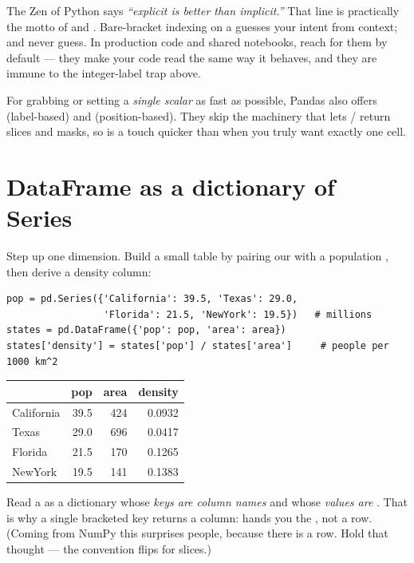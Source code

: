 \documentclass[11pt]{article}
\begin{document}
\begin{keyidea}
The Zen of Python says \emph{``explicit is better than implicit.''} That line is practically the motto of  and . Bare-bracket indexing on a  guesses your intent from context;  and  never guess. In production code and shared notebooks, reach for them by default --- they make your code read the same way it behaves, and they are immune to the integer-label trap above.
\end{keyidea}

For grabbing or setting a \emph{single scalar} as fast as possible, Pandas also offers  (label-based) and  (position-based). They skip the machinery that lets / return slices and masks, so  is a touch quicker than  when you truly want exactly one cell.

\section{DataFrame as a dictionary of Series}

Step up one dimension. Build a small table by pairing our  with a population , then derive a density column:

\begin{lstlisting}
pop = pd.Series({'California': 39.5, 'Texas': 29.0,
                 'Florida': 21.5, 'NewYork': 19.5})   # millions
states = pd.DataFrame({'pop': pop, 'area': area})
states['density'] = states['pop'] / states['area']     # people per 1000 km^2
\end{lstlisting}

\begin{center}
\renewcommand{\arraystretch}{1.2}
\begin{tabular}{l r r r}
\toprule
 & \textbf{pop} & \textbf{area} & \textbf{density} \\
\midrule
California & 39.5 & 424 & 0.0932 \\
Texas      & 29.0 & 696 & 0.0417 \\
Florida    & 21.5 & 170 & 0.1265 \\
NewYork    & 19.5 & 141 & 0.1383 \\
\bottomrule
\end{tabular}
\end{center}

\begin{intuition}
Read a  as a dictionary whose \emph{keys are column names} and whose \emph{values are }. That is why a single bracketed key returns a column:
 hands you the  , not a row. (Coming from NumPy this surprises people, because there  is a row. Hold that thought --- the convention flips for slices.)
\end{intuition}
\end{document}
